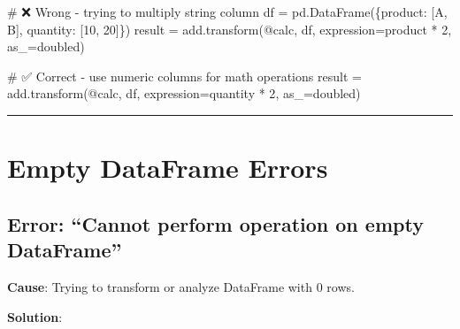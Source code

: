 \documentclass[
  letterpaper,
]{scrbook}
\newenvironment{Shaded}{\begin{snugshade}}{\end{snugshade}}
\newcommand{\CommentTok}[1]{\textcolor[rgb]{0.37,0.37,0.37}{#1}}
\newcommand{\DecValTok}[1]{\textcolor[rgb]{0.68,0.00,0.00}{#1}}
\newcommand{\NormalTok}[1]{\textcolor[rgb]{0.00,0.23,0.31}{#1}}
\newcommand{\OperatorTok}[1]{\textcolor[rgb]{0.37,0.37,0.37}{#1}}
\newcommand{\StringTok}[1]{\textcolor[rgb]{0.13,0.47,0.30}{#1}}
\begin{document}
\begin{Shaded}
\begin{Highlighting}[]
\CommentTok{\# ❌ Wrong {-} trying to multiply string column}
\NormalTok{df }\OperatorTok{=}\NormalTok{ pd.DataFrame(\{}\StringTok{\textquotesingle{}product\textquotesingle{}}\NormalTok{: [}\StringTok{\textquotesingle{}A\textquotesingle{}}\NormalTok{, }\StringTok{\textquotesingle{}B\textquotesingle{}}\NormalTok{], }\StringTok{\textquotesingle{}quantity\textquotesingle{}}\NormalTok{: [}\DecValTok{10}\NormalTok{, }\DecValTok{20}\NormalTok{]\})}
\NormalTok{result }\OperatorTok{=}\NormalTok{ add.transform(}\StringTok{\textquotesingle{}@calc\textquotesingle{}}\NormalTok{, df, expression}\OperatorTok{=}\StringTok{\textquotesingle{}product * 2\textquotesingle{}}\NormalTok{, as\_}\OperatorTok{=}\StringTok{\textquotesingle{}doubled\textquotesingle{}}\NormalTok{)}

\CommentTok{\# ✅ Correct {-} use numeric columns for math operations}
\NormalTok{result }\OperatorTok{=}\NormalTok{ add.transform(}\StringTok{\textquotesingle{}@calc\textquotesingle{}}\NormalTok{, df, expression}\OperatorTok{=}\StringTok{\textquotesingle{}quantity * 2\textquotesingle{}}\NormalTok{, as\_}\OperatorTok{=}\StringTok{\textquotesingle{}doubled\textquotesingle{}}\NormalTok{)}
\end{Highlighting}
\end{Shaded}

\begin{center}\rule{0.5\linewidth}{0.5pt}\end{center}

\section{Empty DataFrame Errors}\label{empty-dataframe-errors}

\subsection{Error: ``Cannot perform operation on empty
DataFrame''}\label{error-cannot-perform-operation-on-empty-dataframe}

\textbf{Cause}: Trying to transform or analyze DataFrame with 0 rows.

\textbf{Solution}:
\end{document}
